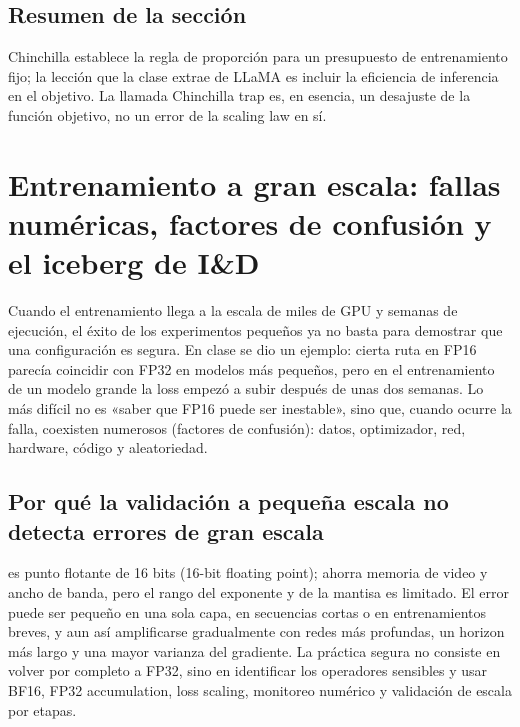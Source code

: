 \documentclass[a4paper]{article}
\begin{document}

\subsection{Resumen de la sección}

Chinchilla establece la regla de proporción para un presupuesto de entrenamiento fijo; la lección que la clase extrae de LLaMA es incluir la eficiencia de inferencia en el objetivo. La llamada Chinchilla trap es, en esencia, un desajuste de la función objetivo, no un error de la scaling law en sí.
\section{Entrenamiento a gran escala: fallas numéricas, factores de confusión y el iceberg de I\&D}

Cuando el entrenamiento llega a la escala de miles de GPU y semanas de ejecución, el éxito de los experimentos pequeños ya no basta para demostrar que una configuración es segura. En clase se dio un ejemplo: cierta ruta en FP16 parecía coincidir con FP32 en modelos más pequeños, pero en el entrenamiento de un modelo grande la loss empezó a subir después de unas dos semanas. Lo más difícil no es «saber que FP16 puede ser inestable», sino que, cuando ocurre la falla, coexisten numerosos  (factores de confusión): datos, optimizador, red, hardware, código y aleatoriedad.

\subsection{Por qué la validación a pequeña escala no detecta errores de gran escala}

 es punto flotante de 16 bits (16-bit floating point); ahorra memoria de video y ancho de banda, pero el rango del exponente y de la mantisa es limitado. El error puede ser pequeño en una sola capa, en secuencias cortas o en entrenamientos breves, y aun así amplificarse gradualmente con redes más profundas, un horizon más largo y una mayor varianza del gradiente. La práctica segura no consiste en volver por completo a FP32, sino en identificar los operadores sensibles y usar BF16, FP32 accumulation, loss scaling, monitoreo numérico y validación de escala por etapas.
\end{document}
